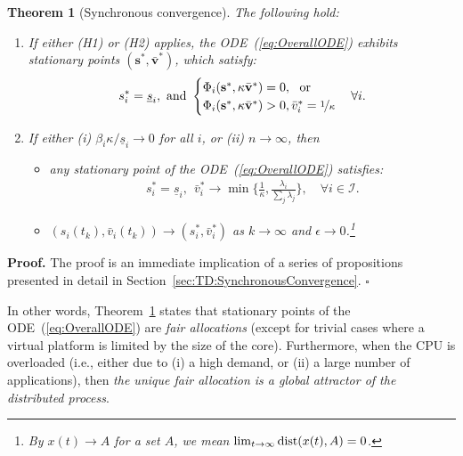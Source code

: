 \documentclass[letter,11pt]{article}
\newtheorem{theorem}{Theorem}[section]
\newenvironment{proof}{\textbf{Proof.}}{$\square$\\}
\begin{document}
\begin{theorem}[Synchronous convergence] \label{Th:SynchronousConvergence}
The following hold:
\begin{enumerate}
\item If either (H1) or (H2) applies, the ODE~(\ref{eq:OverallODE}) exhibits stationary points $({\mathbf{s}}^*,{\bar{\mathbf{v}}}^*)$, which satisfy: 
\begin{eqnarray}	\label{eq:StationaryPoints}
s_i^*=\underline{s}_i, \mbox{ and } \begin{cases}\Phi_i({\mathbf{s}}^*,\kappa{\bar{\mathbf{v}}}^*)=0, \ \ \mbox{or} \\ \Phi_i({\mathbf{s}}^*,\kappa{\bar{\mathbf{v}}}^*)>0,{\bar{v}}_i^* = \nicefrac{1}{\kappa} \end{cases} \forall {i}.
\end{eqnarray}
\item If either (i) $\beta_i\kappa/\underline{s}_i\to{0}$ for all $i$, or (ii) $n\to\infty$, then
\begin{itemize}
\item[(a)] any stationary point of the ODE~(\ref{eq:OverallODE}) satisfies:
\begin{eqnarray} \label{eq:SpecialStationaryPoint} 
s_i^* = \underline{s}_i, \ \ {\bar{v}}_i^* \to  \min\Big\{ \frac{1}\kappa, \frac{\lambda_i}{\sum_j\lambda_j}\Big\}, \quad \forall i\in\mathcal{I}.
\end{eqnarray}
\item[(b)] $(s_i(t_k),{\bar{v}}_i(t_k))\to(s_i^*,{\bar{v}}_i^*)$ as $k\to\infty$ and $\epsilon\to{0}$.\footnote{By $x(t)\to{A}$ for a set $A$, we mean $\lim_{t\to\infty}{\rm dist}(x(t),A)=0$.}
\end{itemize}
\end{enumerate}
\end{theorem}
\begin{proof}
  The proof is an immediate implication of a series of propositions presented in detail in Section~\ref{sec:TD:SynchronousConvergence}.
\end{proof}

In other words, Theorem~\ref{Th:SynchronousConvergence} states that stationary points of the ODE~(\ref{eq:OverallODE}) are \emph{fair allocations} (except for trivial cases where a virtual platform is limited by the size of the core). Furthermore, when the CPU is overloaded (i.e., either due to (i) a high demand, or (ii) a large number of applications), then \emph{the unique fair allocation is a global attractor of the distributed process}.
\end{document}
